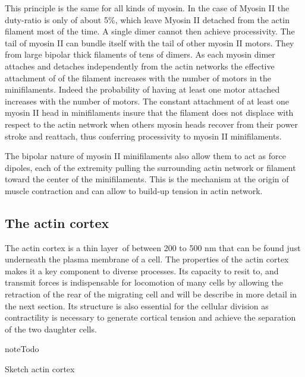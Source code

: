 \documentclass[A4paperpaper,11pt,english]{sphinxmanual}
\begin{document}
This principle is the same for all kinds of myosin. In the case of Myosin II
the duty-ratio is only of about 5\%, which leave Myosin II detached from the
actin filament most of the time. A single dimer cannot then achieve
processivity.   The tail of myosin II can bundle itself with the tail of other
myosin II motors.  They from large bipolar thick filaments of tens of dimers.
As each myosin dimer attaches and detaches independently from the actin
networks the effective attachment of of the filament increases with the number
of motors in the minifilaments. Indeed the probability of having at least one
motor attached increases with the number of motors. The constant attachment of
at least one myosin II head in minifilaments insure that the filament does not
displace with respect to the actin network when others myosin heads recover
from their power stroke and reattach, thus conferring processivity to myosin II
minifilaments.

The bipolar nature of myosin II minifilaments also allow them to act as force
dipoles, each  of the extremity pulling the surrounding actin network or
filament toward the center of the minifilaments. This is the mechanism at the
origin of muscle contraction and can allow to build-up tension in actin network.


\subsection{The actin cortex}
\label{parts/part1:the-actin-cortex}
The actin cortex is a thin layer of between 200 to 500 nm that can be found
just underneath the plasma membrane of a cell. The properties of the actin
cortex makes it a key component to diverse processes.  Its capacity to resit
to, and transmit forces is indispensable for locomotion of many cells by
allowing the retraction of the rear of the migrating cell and will be describe
in more detail in the next section. Its structure is also essential for the
cellular division as contractility is necessary to generate cortical tension
and achieve the separation of the two daughter cells.

\begin{notice}{note}{Todo}

Sketch actin cortex
\end{notice}
\end{document}
